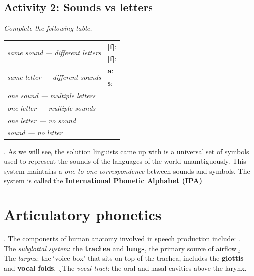 \documentclass[11pt, oneside]{article}   	%
\begin{document}
\subsection{Activity 2: Sounds vs letters}

{\itshape Complete the following table.}

\begin{center}
\begin{tabular}{ | l | p{5cm} | } \hline
\multirow{2}{*}{\itshape same sound --- different letters} 	& 	{\bfseries [f]}: \\
											&	{\bfseries [f]}: \\ \hline
\multirow{2}{*}{\itshape same letter --- different sounds} 	& 	{\bfseries a}: \\
											&	{\bfseries s}: \\ \hline
\multirow{2}{*}{\itshape one sound --- multiple letters} 	& 	 \\
											&	\\ \hline
\multirow{2}{*}{\itshape one letter --- multiple sounds} 	& 	 \\
											&	 \\ \hline
\multirow{2}{*}{\itshape one letter --- no sound} 			& 	 \\
											&	 \\ \hline
\multirow{2}{*}{\itshape sound --- no letter} 			& 	 \\
											&	 \\ \hline
\end{tabular}
\end{center}

\ex. As we will see, the solution linguists came up with is a universal set of symbols used to represent the sounds of the languages of the world unambiguously.  This system maintains a {\itshape one-to-one correspondence} between sounds and symbols.  The system is called the {\bfseries International Phonetic Alphabet (IPA)}.											 
\section{Articulatory phonetics}

\ex. The components of human anatomy involved in speech production include:
\a. The {\itshape subglottal system}: the {\bfseries trachea} and {\bfseries lungs}, the primary source of airflow
\b. The {\itshape larynx}: the `voice box' that sits on top of the trachea, includes the {\bfseries glottis} and {\bfseries vocal folds}.
\c. The {\itshape vocal tract}: the oral and nasal cavities above the larynx.
\end{document}
